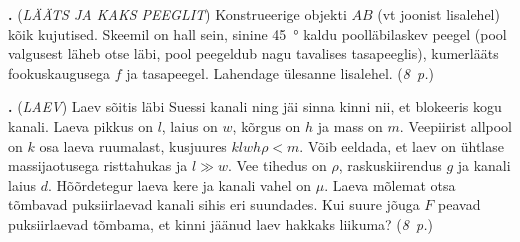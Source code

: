 \documentclass[11pt,a5paper]{article}
\newcommand{\numb}[1]{\vspace{5pt}\textbf{\large #1}}
\newcommand{\nimi}[1]{(\textsl{\small \uppercase{#1}})}
\newcommand{\punktid}[1]{(\emph{#1~p.})}
\newcounter{ylesanne}
\newcommand{\yl}[1]{\addtocounter{ylesanne}{1}\numb{\theylesanne.} \nimi{#1} \newblock{}}
\newcommand{\autor}[1]{}%
\begin{document}
\newpage
\yl{LÄÄTS JA KAKS PEEGLIT}
Konstrueerige objekti $AB$ (vt joonist lisalehel) kõik kujutised. Skeemil on hall sein, sinine \SI{45}{\degree} kaldu poolläbilaskev peegel (pool valgusest läheb otse läbi, pool peegeldub nagu tavalises tasapeeglis), kumerlääts fookuskaugusega $f$ ja tasapeegel. Lahendage ülesanne lisalehel.
\punktid{8} \autor{Aigar Vaigu}

\yl{Laev}
Laev sõitis läbi Suessi kanali ning jäi sinna kinni nii, et blokeeris kogu kanali. Laeva pikkus on $l$, laius on $w$, kõrgus on $h$ ja mass on $m$. Veepiirist allpool on $k$ osa laeva ruumalast, kusjuures $klwh\rho < m$. Võib eeldada, et laev on ühtlase massijaotusega risttahukas ja $l \gg w$. Vee tihedus on $\rho$, raskuskiirendus $g$ ja kanali laius $d$. Hõõrdetegur laeva kere ja kanali vahel on $\mu$. Laeva mõlemat otsa tõmbavad puksiirlaevad kanali sihis eri suundades. Kui suure jõuga $F$ peavad puksiirlaevad tõmbama, et kinni jäänud laev hakkaks liikuma?
\punktid{8} \autor{Kaarel Kivisalu}
\end{document}
